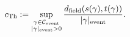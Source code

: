\setcounter{equation}{28}
\begin{equation}
c_{\mathrm{Th}}:=\sup_{\substack{\gamma\in\mathcal C_{\mathrm{event}}\\|\gamma|_{\mathrm{event}}>0}}
\frac{d_{\mathrm{field}}(s(\gamma),t(\gamma))}{|\gamma|_{\mathrm{event}}}.
\label{eq:cth}
\end{equation}
